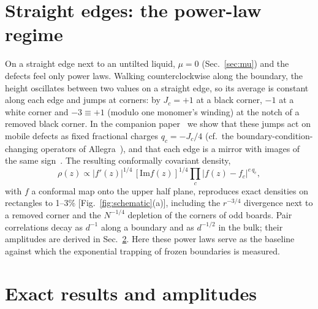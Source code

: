 \documentclass[aps,pre,twocolumn,superscriptaddress,nofootinbib,floatfix]{revtex4-2}
\begin{document}
\section{Straight edges: the power-law regime}
\label{sec:coulomb}
On a straight edge next to an untilted liquid, $\mu=0$ (Sec.~\ref{sec:mu}) and the defects feel only power laws. Walking counterclockwise along the boundary, the height oscillates between two values on a straight edge, so its average is constant along each edge and jumps at corners: by $J_c=+1$ at a black corner, $-1$ at a white corner and $-3\equiv+1$ (modulo one monomer's winding) at the notch of a removed black corner. In the companion paper~\cite{PaperII} we show that these jumps act on mobile defects as fixed fractional charges $q_c=-J_c/4$ (cf.\ the boundary-condition-changing operators of Allegra~\cite{Allegra2015}), and that each edge is a mirror with images of the same sign~\cite{Ciucu2015}. The resulting conformally covariant density,
\begin{equation}
\rho(z)\propto|f'(z)|^{1/4}\,[\mathrm{Im}f(z)]^{1/4}\prod_c|f(z)-f_c|^{e\,q_c},
\label{eq:density}
\end{equation}
with $f$ a conformal map onto the upper half plane, reproduces exact densities on rectangles to 1--3\% [Fig.~\ref{fig:schematic}(a)], including the $r^{-3/4}$ divergence next to a removed corner and the $N^{-1/4}$ depletion of the corners of odd boards. Pair correlations decay as $d^{-1}$ along a boundary and as $d^{-1/2}$ in the bulk; their amplitudes are derived in Sec.~\ref{sec:exact}. Here these power laws serve as the baseline against which the exponential trapping of frozen boundaries is measured.

\section{Exact results and amplitudes}
\label{sec:exact}
\end{document}
